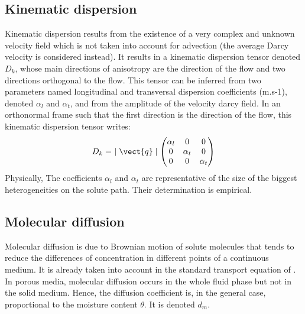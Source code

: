 \subsection{Kinematic dispersion}
%
Kinematic dispersion results from the existence of a very complex and unknown velocity field which is
not taken into account for advection (the average Darcy velocity is considered instead).
It results in a kinematic dispersion tensor denoted $D_k$, whose main directions of anisotropy are the direction of the flow and
two directions orthogonal to the flow. This tensor can be inferred from two parameters named longitudinal and transversal dispersion coefficients (m.s-1),
denoted $\alpha_l$ and $\alpha_t$, and from the amplitude of the velocity darcy field.
In an orthonormal frame such that the first direction is the direction of the flow, this
kinematic dispersion tensor writes:
\begin{equation}
\label{eq:groundwater:dispersion_tensor}
D_k = \ \mid \vect{q} \mid
\begin{pmatrix}
\alpha_l & 0 & 0 \\
0 & \alpha_t & 0 \\
0 & 0 & \alpha_t
\end{pmatrix}
\end{equation}
Physically, The coefficients $\alpha_l$ and $\alpha_t$ are representative of the size of the biggest heterogeneities on the solute path. Their
determination is empirical.

\subsection{Molecular diffusion}
Molecular diffusion is due to Brownian motion of solute molecules that tends to reduce the differences
of concentration in different points of a continuous medium.
It is already taken into account in the standard transport equation of \CS.
In porous media, molecular diffusion occurs in the whole fluid phase but not in the solid medium. Hence, the diffusion coefficient
is, in the general case, proportional to the moisture content $\theta$. It is denoted $d_m$.

